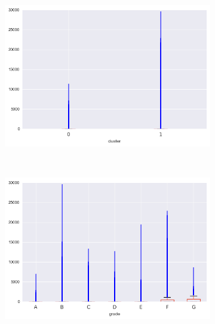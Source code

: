 \begin{apendicesenv}
\begin{figure}[t!]
\begin{subfigure}[t]{0.5\textwidth}
			\centerline{\includegraphics[width=1.05\textwidth]{img/recoveries_by_cluster}}
    	\end{subfigure}%
    	~ 
    	\begin{subfigure}[t]{0.5\textwidth}
    		\centering
   
			\centerline{\includegraphics[width=1.05\textwidth]{img/recoveries_by_grade}}

    	\end{subfigure}
\end{figure}


\begin{figure}[t!]
    \centering
        \caption{open\textunderscore acc }
    	\begin{subfigure}[t]{0.5\textwidth}
    		\centering


\end{subfigure}
\end{figure}
\end{apendicesenv}
